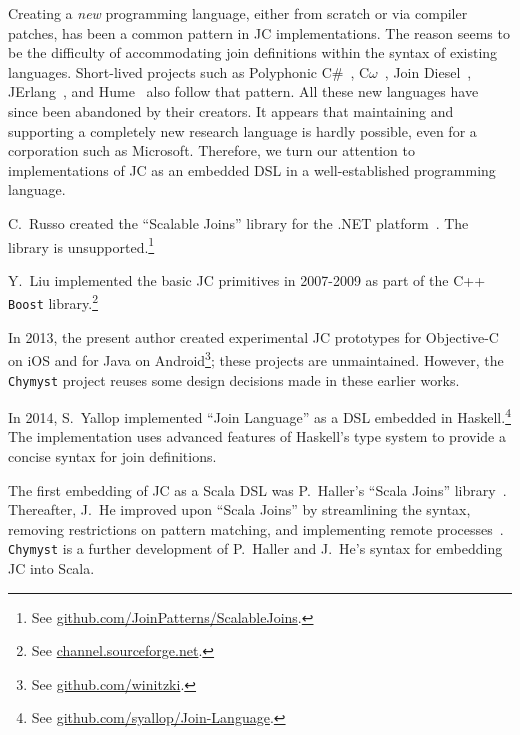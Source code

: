 \documentclass[sigplan,10pt,review,anonymous]{acmart}\settopmatter{printfolios=true}
\begin{document}
Creating a \emph{new} programming language, either from scratch or
via compiler patches, has been a common pattern in JC implementations.
The reason seems to be the difficulty of accommodating join definitions
within the syntax of existing languages. Short-lived projects such
as Polyphonic C\#~\citep{BenFou2002}, C$\omega$~\citep{Rus2007},
Join Diesel~\citep{Ose2005}, JErlang~\citep{PloEis2009}, and Hume~\citep{HamEA2006}
also follow that pattern. All these new languages have since been
abandoned by their creators. It appears that maintaining and supporting
a completely new research language is hardly possible, even for a
corporation such as Microsoft. Therefore, we turn our attention to
implementations of JC as an embedded DSL in a well-established programming
language. 

C.~Russo created the ``Scalable Joins'' library for the .NET platform~\citep{Rus2007}.
The library is unsupported.\footnote{ See \href{https://github.com/JoinPatterns/ScalableJoins}{github.com/JoinPatterns/ScalableJoins}.}

\begin{comment}
(This is not actually JC but CSP!) In 2009, F.~Peschanski published
a JC library for the Lua language, called ``LuaPi''. The library
appears to be unsupported.\footnote{ See \href{https://github.com/fredokun/LuaPi}{github.com/fredokun/LuaPi}.}
\end{comment}

Y.~Liu implemented the basic JC primitives in 2007-2009 as part of
the C++ \texttt{Boost} library.\footnote{ See \href{http://channel.sourceforge.net/}{channel.sourceforge.net}.} 

In 2013, the present author created experimental JC prototypes for
Objective-C on iOS and for Java on Android\footnote{ See \href{https://github.com/winitzki}{github.com/winitzki}.};
these projects are unmaintained. However, the \texttt{Chymyst} project
reuses some design decisions made in these earlier works.

In 2014, S.~Yallop implemented ``Join Language'' as a DSL embedded
in Haskell.\footnote{ See \href{https://github.com/syallop/Join-Language}{github.com/syallop/Join-Language}.}
The implementation uses advanced features of Haskell's type system
to provide a concise syntax for join definitions.

The first embedding of JC as a Scala DSL was P.~Haller's ``Scala
Joins'' library~\citep{HalCut2008}. Thereafter, J.~He improved
upon ``Scala Joins'' by streamlining the syntax, removing restrictions
on pattern matching, and implementing remote processes~\citep{He2014}.
\texttt{Chymyst} is a further development of P.~Haller and J.~He's
syntax for embedding JC into Scala.
\end{document}
